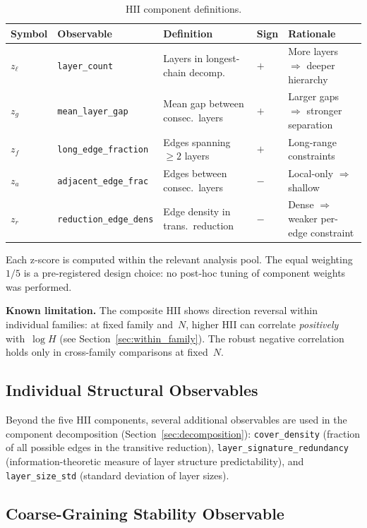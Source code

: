 \documentclass[entropy,article,submit,pdftex,moreauthors]{Definitions/mdpi}
\begin{document}
\begin{table}[H]
\caption{HII component definitions.\label{tab:hii_components}}
\begin{tabular}{lllll}
\toprule
\textbf{Symbol} & \textbf{Observable} & \textbf{Definition} & \textbf{Sign} & \textbf{Rationale} \\
\midrule
$z_\ell$ & \texttt{layer\_count} & Layers in longest-chain decomp. & $+$ & More layers $\Rightarrow$ deeper hierarchy \\
$z_g$ & \texttt{mean\_layer\_gap} & Mean gap between consec.\ layers & $+$ & Larger gaps $\Rightarrow$ stronger separation \\
$z_f$ & \texttt{long\_edge\_fraction} & Edges spanning $\ge 2$ layers & $+$ & Long-range constraints \\
$z_a$ & \texttt{adjacent\_edge\_frac} & Edges between consec.\ layers & $-$ & Local-only $\Rightarrow$ shallow \\
$z_r$ & \texttt{reduction\_edge\_dens} & Edge density in trans.\ reduction & $-$ & Dense $\Rightarrow$ weaker per-edge constraint \\
\bottomrule
\end{tabular}
\end{table}

Each z-score is computed within the relevant analysis pool. The equal weighting $1/5$ is a pre-registered design choice: no post-hoc tuning of component weights was performed.

\textbf{Known limitation.} The composite HII shows direction reversal within individual families: at fixed family and~$N$, higher HII can correlate \emph{positively} with~$\log H$ (see Section~\ref{sec:within_family}). The robust negative correlation holds only in cross-family comparisons at fixed~$N$.

\subsection{Individual Structural Observables}

Beyond the five HII components, several additional observables are used in the component decomposition (Section~\ref{sec:decomposition}): \texttt{cover\_density} (fraction of all possible edges in the transitive reduction), \texttt{layer\_signature\_redundancy} (information-theoretic measure of layer structure predictability), and \texttt{layer\_size\_std} (standard deviation of layer sizes).

\subsection{Coarse-Graining Stability Observable}
\end{document}
